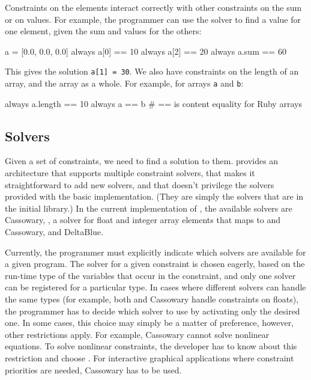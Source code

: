 
Constraints on the elements interact correctly with other constraints
on the sum or on values.  For example, the programmer can use the
solver to find a value for one element, given the sum and values for
the others:

\begin{code}
a = [0.0, 0.0, 0.0]
always { a[0] == 10 }
always { a[2] == 20 }
always { a.sum == 60 }
\end{code}

This gives the solution \lstinline{a[1] = 30}.
We also have constraints on the length of an array, and the array as a
whole.  For example, for arrays \lstinline{a} and \lstinline{b}:

\begin{code}
always { a.length == 10 }
always { a == b } # == is content equality for Ruby arrays
\end{code}


\subsection{Solvers}
\label{sec:solvers}

Given a set of constraints, we need to find a solution to them.
\langname provides an architecture that supports multiple constraint
solvers, that makes it straightforward to add new solvers, and that
doesn't privilege the solvers provided with the basic implementation.
(They are simply the solvers that are in the initial library.)  In the
current implementation of \toolname, the available solvers are
Cassowary, \zthree, a solver for float and integer array elements that
maps to \zthree and Cassowary, and DeltaBlue.

Currently, the programmer must explicitly indicate which solvers are
available for a given program.  The solver for a given constraint is
chosen eagerly, based on the run-time type of the variables
that occur in the constraint, and only one solver can be registered
for a particular type. In cases where different solvers can handle the
same types (for example, both \zthree and Cassowary handle constraints
on floats), the programmer has to decide which solver to use by
activating only the desired one. In some cases, this choice may simply
be a matter of preference, however, other restrictions apply. For
example, Cassowary cannot solve nonlinear equations. To solve
nonlinear constraints, the developer has to know about this
restriction and choose \zthree. For interactive graphical applications
where constraint priorities are needed, Cassowary has to be used.

